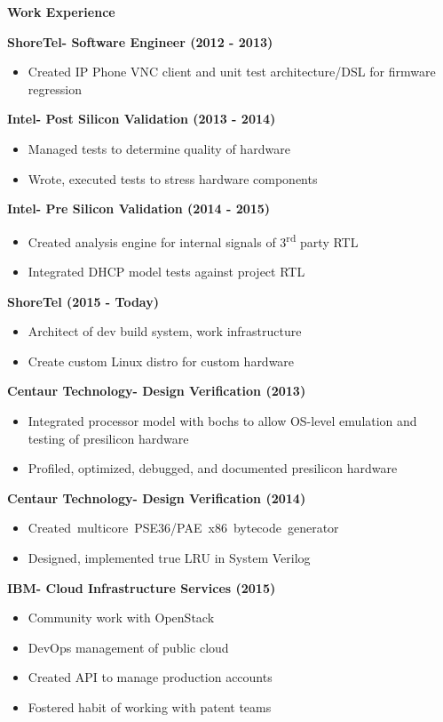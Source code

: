 \documentclass{report}
\begin{document}
\textbf{Work Experience} \\
\begin{paracol}{2}
  \textbf{ShoreTel- Software Engineer (2012 - 2013)}
  \begin{itemize}[label=$\circ$]
  \item Created IP Phone VNC client and unit test architecture/DSL for firmware
    regression
  \end{itemize}

  \textbf{Intel- Post Silicon Validation (2013 - 2014)}
  \begin{itemize}[label=$\circ$]
  \item Managed tests to determine quality of hardware
  \item Wrote, executed tests to stress hardware components
  \end{itemize}

  \textbf{Intel- Pre Silicon Validation (2014 - 2015)}
  \begin{itemize}[label=$\circ$]
  \item Created analysis engine for internal signals of 3\textsuperscript{rd} party RTL
  \item Integrated DHCP model tests against project RTL
  \end{itemize}

  \textbf{ShoreTel (2015 - Today)}
  \begin{itemize}[label=$\circ$]
  \item Architect of dev build system, work infrastructure
  \item Create custom Linux distro for custom hardware
  \end{itemize}

  \switchcolumn{}
  \textbf{Centaur Technology- Design Verification (2013)}
  \begin{itemize}[label=$\circ$]
  \item Integrated processor model with bochs to allow OS-level
    emulation and testing of presilicon hardware
  \item Profiled, optimized, debugged, and documented presilicon hardware
  \end{itemize}

  \textbf{Centaur Technology- Design Verification (2014)}
  \begin{itemize}[label=$\circ$]
  \item \mbox{Created multicore PSE36/PAE x86 bytecode generator}
  \item Designed, implemented true LRU in System Verilog
  \end{itemize}

  \textbf{IBM- Cloud Infrastructure Services (2015)}
  \begin{itemize}[label=$\circ$]
  \item Community work with OpenStack
  \item DevOps management of public cloud
  \item Created API to manage production accounts
  \item Fostered habit of working with patent teams
  \end{itemize}
\end{paracol}
\end{document}
